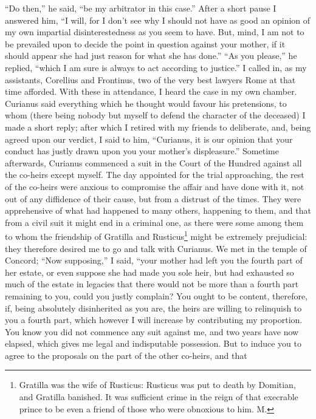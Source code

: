 ``Do then,'' he said, ``be my arbitrator in this case.'' After a short pause I
answered him, ``I will, for I don't see why I should not have as good an
opinion of my own impartial disinterestedness as you seem to have. But,
mind, I am not to be prevailed upon to decide the point in question
against your mother, if it should appear she had just reason for what she
has done.'' ``As you please,'' he replied, ``which I am sure is always to act
according to justice.'' I called in, as my assistants, Corellius and
Frontinus, two of the very best lawyers Rome at that time afforded. With
these in attendance, I heard the case in my own chamber. Curianus said
everything which he thought would favour his pretensions, to whom (there
being nobody but myself to defend the character of the deceased) I made a
short reply; after which I retired with my friends to deliberate, and,
being agreed upon our verdict, I said to him, ``Curianus, it is our opinion
that your conduct has justly drawn upon you your mother's displeasure.''
Sometime afterwards, Curianus commenced a suit in the Court of the Hundred
against all the co-heirs except myself. The day appointed for the trial
approaching, the rest of the co-heirs were anxious to compromise the
affair and have done with it, not out of any diffidence of their cause,
but from a distrust of the times. They were apprehensive of what had
happened to many others, happening to them, and that from a civil suit it
might end in a criminal one, as there were some among them to whom the
friendship of Gratilla and Rusticus\footnote{Gratilla was the wife of
Rusticus: Rusticus was put to death by Domitian, and Gratilla banished. It
was sufficient crime in the reign of that execrable prince to be even a
friend of those who were obnoxious to him. M.} might be extremely
prejudicial: they therefore desired me to go and talk with Curianus. We
met in the temple of Concord; ``Now supposing,'' I said, ``your mother had
left you the fourth part of her estate, or even suppose she had made you
sole heir, but had exhausted so much of the estate in legacies that there
would not be more than a fourth part remaining to you, could you justly
complain? You ought to be content, therefore, if, being absolutely
disinherited as you are, the heirs are willing to relinquish to you a
fourth part, which however I will increase by contributing my proportion.
You know you did not commence any suit against me, and two years have now
elapsed, which gives me legal and indisputable possession. But to induce
you to agree to the proposals on the part of the other co-heirs, and that
